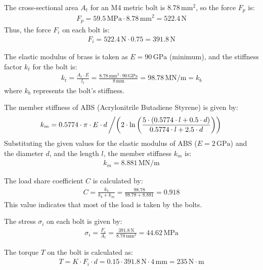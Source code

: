 \documentclass[12pt]{article}
\begin{document}
The cross-sectional area \( A_t \) for an M4 metric bolt is \( 8.78 \, \text{mm}^2 \), so the force \( F_p \) is:
\begin{align}
F_p = 59.5 \, \text{MPa} \cdot 8.78 \, \text{mm}^2 = 522.4 \, \text{N}
\end{align}
Thus, the force \( F_i \) on each bolt is:
\begin{align}
F_i = 522.4 \, \text{N} \cdot 0.75 = 391.8 \, \text{N}
\end{align}

The elastic modulus of brass is taken as \( E = 90 \, \text{GPa} \) (minimum), and the stiffness factor \( k_t \) for the bolt is:
\begin{align}
k_t = \frac{A_t \cdot E}{l_t} = \frac{8.78 \, \text{mm}^2 \cdot 90 \, \text{GPa}}{8 \, \text{mm}} = 98.78 \, \text{MN/m} = k_b
\end{align}
where \( k_b \) represents the bolt's stiffness.

The member stiffness of ABS (Acrylonitrile Butadiene Styrene) is given by:
\begin{align}
k_m = 0.5774 \cdot \pi \cdot E \cdot d \left/ \left( 2 \cdot \ln \left( \frac{5 \cdot (0.5774 \cdot l + 0.5 \cdot d)}{0.5774 \cdot l + 2.5 \cdot d} \right) \right) \right.
\end{align}
Substituting the given values for the elastic modulus of ABS (\( E = 2 \, \text{GPa} \)) and the diameter \( d \), and the length \( l \), the member stiffness \( k_m \) is:
\begin{align}
k_m = 8.881 \, \text{MN/m}
\end{align}

The load share coefficient \( C \) is calculated by:
\begin{align}
C = \frac{k_b}{k_b + k_m} = \frac{98.78}{98.78 + 8.881} = 0.918
\end{align}
This value indicates that most of the load is taken by the bolts.

The stress \( \sigma_i \) on each bolt is given by:
\begin{align}
\sigma_i = \frac{F_i}{A_t} = \frac{391.8 \, \text{N}}{8.78 \, \text{mm}^2} = 44.62 \, \text{MPa}
\end{align}

The torque \( T \) on the bolt is calculated as:
\begin{align}
T = K \cdot F_i \cdot d = 0.15 \cdot 391.8 \, \text{N} \cdot 4 \, \text{mm} = 235 \, \text{N} \cdot \text{m}   
\end{align}
\end{document}
